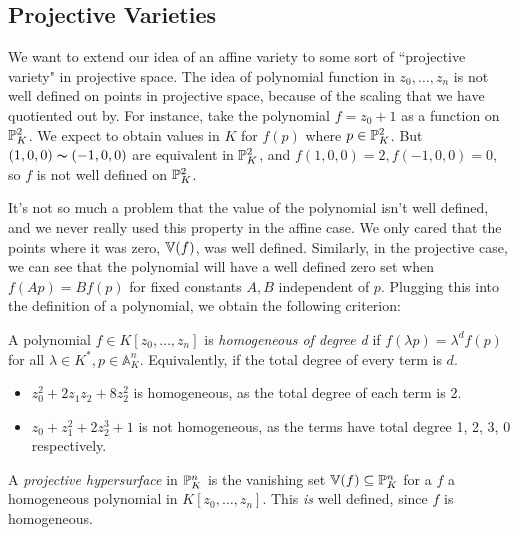 \documentclass[10pt,a4paper,rgb]{article}
\begin{document}
\subsection{Projective Varieties}
We want to extend our idea of an affine variety to some sort of ``projective variety" in projective space. The idea of polynomial function in $z_0, \ldots, z_n$ is not well defined on points in projective space, because of the scaling that we have quotiented out by. For instance, take the polynomial $f=z_0 + 1$ as a function on $\P_K^2$. We expect to obtain values in $K$ for $f(p)$ where $p \in \P_K^2$. But $(1,0,0) \thicksim (-1,0,0)$ are equivalent in $\P_K^2$, and $f(1,0,0) = 2, f(-1,0,0) = 0$, so $f$ is not well defined on $\P^2_K$.

It's not so much a problem that the value of the polynomial isn't well defined, and we never really used this property in the affine case. We only cared that the points where it was zero, $\V(f)$, was well defined. Similarly, in the projective case, we can see that the polynomial will have a well defined zero set when $f(A p) = B f(p)$ for fixed constants $A, B$ independent of $p$. Plugging this into the definition of a polynomial, we obtain the following criterion:

A polynomial $f \in K[z_0, \ldots, z_n]$ is \emph{homogeneous of degree d} if $f(\lambda p) = \lambda^d f(p)$ for all $\lambda \in K^{\ast}, p \in \mathbb{A}_K^n$. Equivalently, if the total degree of every term is $d$.
\begin{itemize}
\item $z_0^2 + 2z_1z_2 + 8z_2^2$ is homogeneous, as the total degree of each term is 2.
\item $z_0 + z_1^2 + 2z_2^3 + 1$ is not homogeneous, as the terms have total degree 1, 2, 3, 0 respectively.
\end{itemize}

A \emph{projective hypersurface} in $\P_K^n$ is the vanishing set $\V(f)\subseteq \P_K^n$ for a $f$ a homogeneous polynomial in $K[z_0, \ldots, z_n]$. This \textit{is} well defined, since $f$ is homogeneous.
\end{document}
